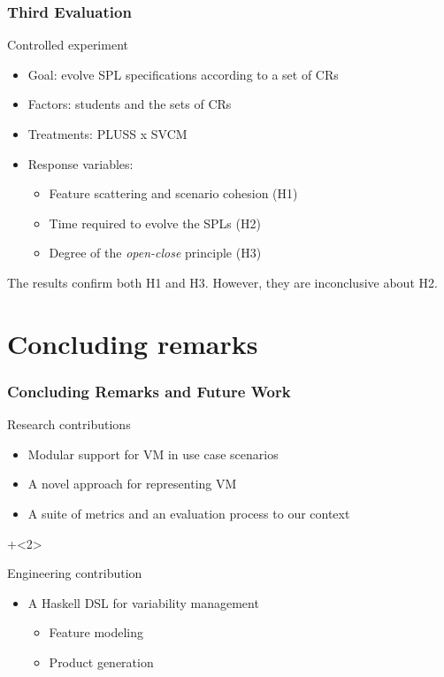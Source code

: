 \documentclass[xcolor=svgnames]{beamer}
\begin{document}
\begin{frame}
\frametitle{Third Evaluation}

\begin{block}{Controlled experiment}
\begin{itemize}
\item Goal: evolve SPL specifications according to a set of CRs
\item Factors: students and the sets of CRs
\item Treatments: PLUSS x SVCM
\item Response variables: 
\begin{itemize}
\item Feature scattering and scenario cohesion (H1)
\item Time required to evolve the SPLs (H2)
\item Degree of the \emph{open-close} principle (H3) %
\end{itemize}
\end{itemize}

\end{block}

The results confirm both H1 and H3. However, they are inconclusive about H2.

\end{frame}


\section{Concluding remarks}

\begin{frame}
\frametitle{Concluding Remarks and Future Work}
\begin{block}{Research contributions}
\begin{itemize}
  \item Modular support for VM in use case scenarios
  \item A novel approach for representing VM 
  \item A suite of metrics and an evaluation process to our context 
\end{itemize}
\end{block}

\onslide+<2>

\begin{block}{Engineering contribution}
 \begin{itemize}
  \item A Haskell DSL for variability management
  \begin{itemize}
    \item Feature modeling 
    \item Product generation
  \end{itemize} 
\end{itemize}
\end{block}

\end{frame}
\end{document}
